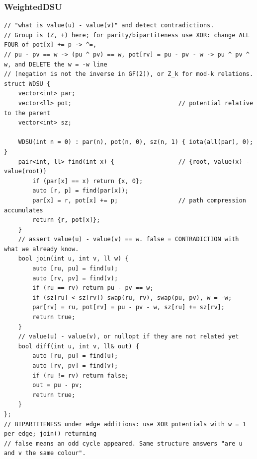 \documentclass[9pt,a4paper,twocolumn]{extarticle}
\begin{document}
\subsubsection{WeightedDSU}
\nopagebreak
\begin{lstlisting}
// "what is value(u) - value(v)" and detect contradictions.
// Group is (Z, +) here; for parity/bipartiteness use XOR: change ALL FOUR of pot[x] += p -> ^=,
// pu - pv == w -> (pu ^ pv) == w, pot[rv] = pu - pv - w -> pu ^ pv ^ w, and DELETE the w = -w line
// (negation is not the inverse in GF(2)), or Z_k for mod-k relations.
struct WDSU {
    vector<int> par;
    vector<ll> pot;                              // potential relative to the parent
    vector<int> sz;

    WDSU(int n = 0) : par(n), pot(n, 0), sz(n, 1) { iota(all(par), 0); }
    pair<int, ll> find(int x) {                  // {root, value(x) - value(root)}
        if (par[x] == x) return {x, 0};
        auto [r, p] = find(par[x]);
        par[x] = r, pot[x] += p;                 // path compression accumulates
        return {r, pot[x]};
    }
    // assert value(u) - value(v) == w. false = CONTRADICTION with what we already know.
    bool join(int u, int v, ll w) {
        auto [ru, pu] = find(u);
        auto [rv, pv] = find(v);
        if (ru == rv) return pu - pv == w;
        if (sz[ru] < sz[rv]) swap(ru, rv), swap(pu, pv), w = -w;
        par[rv] = ru, pot[rv] = pu - pv - w, sz[ru] += sz[rv];
        return true;
    }
    // value(u) - value(v), or nullopt if they are not related yet
    bool diff(int u, int v, ll& out) {
        auto [ru, pu] = find(u);
        auto [rv, pv] = find(v);
        if (ru != rv) return false;
        out = pu - pv;
        return true;
    }
};
// BIPARTITENESS under edge additions: use XOR potentials with w = 1 per edge; join() returning
// false means an odd cycle appeared. Same structure answers "are u and v the same colour".
\end{lstlisting}

\filbreak
\end{document}
